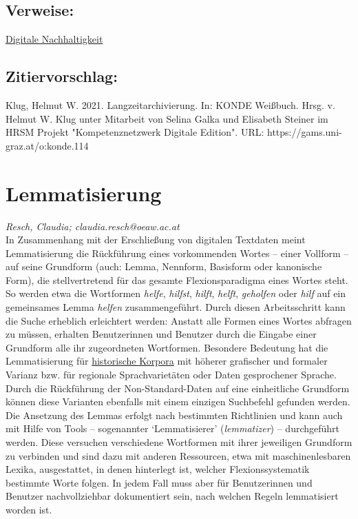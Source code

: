 \documentclass{article}
\begin{document}
        \subsection*{Verweise:}\href{https://gams.uni-graz.at/o:konde.6}{Digitale Nachhaltigkeit}\subsection*{Zitiervorschlag:}Klug, Helmut W. 2021. Langzeitarchivierung. In: KONDE Weißbuch. Hrsg. v. Helmut W. Klug unter Mitarbeit von Selina Galka und Elisabeth Steiner im HRSM Projekt "Kompetenznetzwerk Digitale Edition". URL: https://gams.uni-graz.at/o:konde.114\newpage\section*{Lemmatisierung} \emph{Resch, Claudia; claudia.resch@oeaw.ac.at }\\
        
    In Zusammenhang mit der Erschließung von digitalen Textdaten meint Lemmatisierung die Rückführung eines vorkommenden Wortes – einer Vollform – auf seine Grundform (auch: Lemma, Nennform, Basisform oder kanonische Form), die stellvertretend für das gesamte Flexionsparadigma eines Wortes steht. So werden etwa die Wortformen \emph{helfe}, \emph{hilfst}, \emph{hilft}, \emph{helft}, \emph{geholfen} oder \emph{hilf} auf ein gemeinsames Lemma \emph{helfen} zusammengeführt. Durch diesen Arbeitsschritt kann die Suche erheblich erleichtert werden: Anstatt alle Formen eines Wortes abfragen zu müssen, erhalten Benutzerinnen und Benutzer durch die Eingabe einer Grundform alle ihr zugeordneten Wortformen. Besondere Bedeutung hat die Lemmatisierung für \href{http://gams.uni-graz.at/o:konde.94}{historische Korpora} mit höherer grafischer und formaler Varianz bzw. für regionale Sprachvarietäten oder Daten gesprochener Sprache. Durch die Rückführung der Non-Standard-Daten auf eine einheitliche Grundform können diese Varianten ebenfalls mit einem einzigen Suchbefehl gefunden werden.\\
            
        Die Ansetzung des Lemmas erfolgt nach bestimmten Richtlinien und kann auch mit Hilfe von Tools – sogenannter ‘Lemmatisierer’ (\emph{lemmatizer}) – durchgeführt werden. Diese versuchen verschiedene Wortformen mit ihrer jeweiligen Grundform zu verbinden und sind dazu mit anderen Ressourcen, etwa mit maschinenlesbaren Lexika, ausgestattet, in denen hinterlegt ist, welcher Flexionssystematik bestimmte Worte folgen. In jedem Fall muss aber für Benutzerinnen und Benutzer nachvollziehbar dokumentiert sein, nach welchen Regeln lemmatisiert worden ist.\\
            
\end{document}
